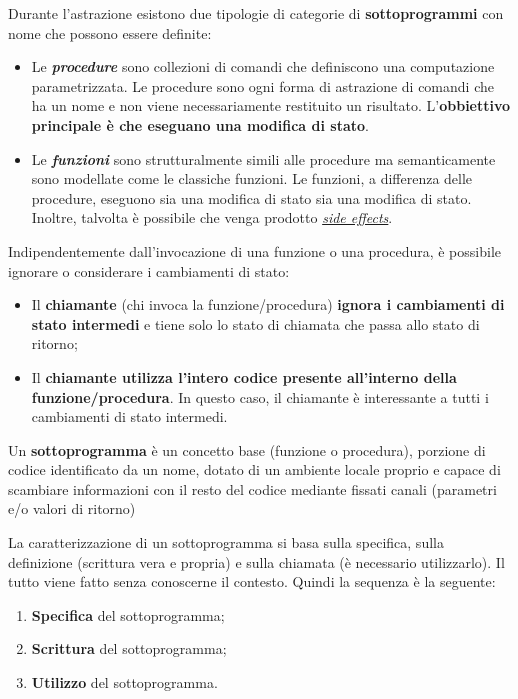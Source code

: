 \documentclass[a4paper]{article}
\begin{document}
 	Durante l'astrazione esistono due tipologie di categorie di \textbf{sottoprogrammi} con nome che possono essere definite:
 	\begin{itemize}
 		\item Le \textbf{\emph{procedure}} sono collezioni di comandi che definiscono una computazione parametrizzata.\newline
 		Le procedure sono ogni forma di astrazione di comandi che ha un nome e non viene necessariamente restituito un risultato. L'\textbf{obbiettivo principale è che eseguano una modifica di stato}.
 		
 		\item Le \textbf{\emph{funzioni}} sono strutturalmente simili alle procedure ma semanticamente sono modellate come le classiche funzioni.\newline
 		Le funzioni, a differenza delle procedure, eseguono sia una modifica di stato sia una modifica di stato. Inoltre, talvolta è possibile che venga prodotto \href{https://en.m.wikipedia.org/wiki/Side_effect_(computer_science)}{\emph{side effects}}.
 	\end{itemize}
 	Indipendentemente dall'invocazione di una funzione o una procedura, è possibile ignorare o considerare i cambiamenti di stato:
 	\begin{itemize}
 		\item Il \textbf{chiamante} (chi invoca la funzione/procedura) \textbf{ignora i cambiamenti di stato intermedi} e tiene solo lo stato di chiamata che passa allo stato di ritorno;
 		
 		\item Il \textbf{chiamante utilizza l'intero codice presente all'interno della funzione/procedura}. In questo caso, il chiamante è interessante a tutti i cambiamenti di stato intermedi.
 	\end{itemize}
 	
 	\noindent
 	\begin{boxdef}
 		Un \textcolor{Red3}{\textbf{sottoprogramma}} è un concetto base (funzione o procedura), porzione di codice identificato da un nome, dotato di un ambiente locale proprio e capace di scambiare informazioni con il resto del codice mediante fissati canali (parametri e/o valori di ritorno)
 	\end{boxdef}
 	
 	\noindent
 	La caratterizzazione di un sottoprogramma si basa sulla specifica, sulla definizione (scrittura vera e propria) e sulla chiamata (è necessario utilizzarlo). Il tutto viene fatto senza conoscerne il contesto. Quindi la sequenza è la seguente:
 	\begin{enumerate}
 		\item \textbf{Specifica} del sottoprogramma;
 		\item \textbf{Scrittura} del sottoprogramma;
 		\item \textbf{Utilizzo} del sottoprogramma.
 	\end{enumerate}\newpage
 	
\end{document}
